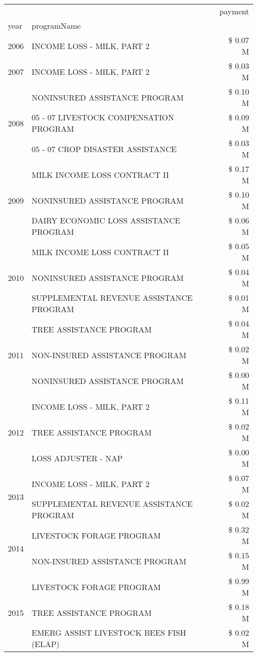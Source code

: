 \begin{tabular}{llr}
\toprule
 &  & payment \\
year & programName &  \\
\midrule
2006 & INCOME LOSS - MILK, PART 2 & \$ 0.07 M \\
\cline{1-3}
2007 & INCOME LOSS - MILK, PART 2 & \$ 0.03 M \\
\cline{1-3}
\multirow[t]{3}{*}{2008} & NONINSURED ASSISTANCE PROGRAM & \$ 0.10 M \\
 & 05 - 07 LIVESTOCK COMPENSATION PROGRAM & \$ 0.09 M \\
 & 05 - 07 CROP DISASTER ASSISTANCE & \$ 0.03 M \\
\cline{1-3}
\multirow[t]{3}{*}{2009} & MILK INCOME LOSS CONTRACT II & \$ 0.17 M \\
 & NONINSURED ASSISTANCE PROGRAM & \$ 0.10 M \\
 & DAIRY ECONOMIC LOSS ASSISTANCE PROGRAM & \$ 0.06 M \\
\cline{1-3}
\multirow[t]{3}{*}{2010} & MILK INCOME LOSS CONTRACT II & \$ 0.05 M \\
 & NONINSURED ASSISTANCE PROGRAM & \$ 0.04 M \\
 & SUPPLEMENTAL REVENUE ASSISTANCE PROGRAM & \$ 0.01 M \\
\cline{1-3}
\multirow[t]{3}{*}{2011} & TREE ASSISTANCE PROGRAM & \$ 0.04 M \\
 & NON-INSURED ASSISTANCE PROGRAM & \$ 0.02 M \\
 & NONINSURED ASSISTANCE PROGRAM & \$ 0.00 M \\
\cline{1-3}
\multirow[t]{3}{*}{2012} & INCOME LOSS - MILK, PART 2 & \$ 0.11 M \\
 & TREE ASSISTANCE PROGRAM & \$ 0.02 M \\
 & LOSS ADJUSTER - NAP & \$ 0.00 M \\
\cline{1-3}
\multirow[t]{2}{*}{2013} & INCOME LOSS - MILK, PART 2 & \$ 0.07 M \\
 & SUPPLEMENTAL REVENUE ASSISTANCE PROGRAM & \$ 0.02 M \\
\cline{1-3}
\multirow[t]{2}{*}{2014} & LIVESTOCK FORAGE PROGRAM & \$ 0.32 M \\
 & NON-INSURED ASSISTANCE PROGRAM & \$ 0.15 M \\
\cline{1-3}
\multirow[t]{3}{*}{2015} & LIVESTOCK FORAGE PROGRAM & \$ 0.99 M \\
 & TREE ASSISTANCE PROGRAM & \$ 0.18 M \\
 & EMERG ASSIST LIVESTOCK BEES FISH (ELAP) & \$ 0.02 M \\

\end{tabular}
